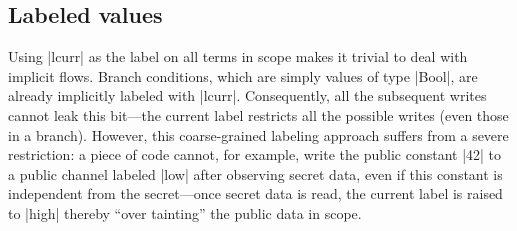 %
%

\subsection{Labeled values}

Using |lcurr| as the label on all terms in scope makes it trivial to deal with
implicit flows. Branch conditions, which are simply values of type |Bool|, are
already implicitly labeled with |lcurr|. Consequently, all the subsequent writes cannot leak
this bit---the current label restricts all the possible writes (even those in
a branch).
%
%
However, this coarse-grained labeling approach suffers from a severe restriction: a piece
of code cannot, for example, %
write the public
constant |42| to a public channel labeled |low| after observing secret
data, even if this constant is independent from the secret---once secret data is read, the current label is raised to |high| thereby
``over tainting'' the public data in scope.


